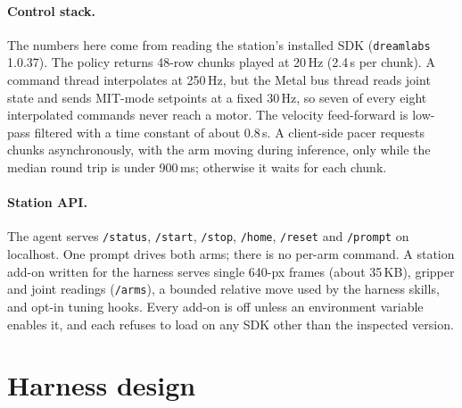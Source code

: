 \documentclass[10pt]{article}
\begin{document}
\paragraph{Control stack.} The numbers here come from reading the station's installed SDK (\texttt{dreamlabs} 1.0.37). The policy returns
48-row chunks played at 20\,Hz (2.4\,s per chunk). A command thread interpolates at 250\,Hz, but the Metal bus thread
reads joint state and sends MIT-mode setpoints at a fixed 30\,Hz, so seven of every eight interpolated commands never
reach a motor. The velocity feed-forward is low-pass filtered with a time constant of about 0.8\,s. A client-side pacer
requests chunks asynchronously, with the arm moving during inference, only while the median round trip is under
900\,ms; otherwise it waits for each chunk.

\paragraph{Station API.} The agent serves \texttt{/status}, \texttt{/start}, \texttt{/stop}, \texttt{/home},
\texttt{/reset} and \texttt{/prompt} on localhost. One prompt drives both arms; there is no per-arm command. A station
add-on written for the harness serves single 640-px frames (about 35\,KB), gripper and joint readings (\texttt{/arms}), a bounded
relative move used by the harness skills, and opt-in tuning hooks. Every add-on is off unless an environment variable
enables it, and each refuses to load on any SDK other than the inspected version.

\section{Harness design}
\label{sec:harness}
\end{document}

